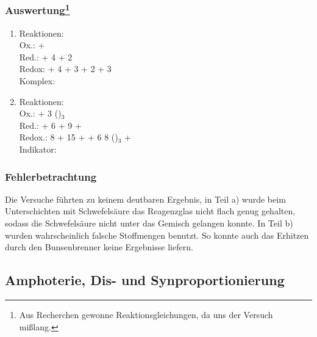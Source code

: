 \documentclass{scrartcl}
\begin{document}
\subsubsection[Auswertung]{Auswertung\footnote{Aus Recherchen gewonne Reaktionsgleichungen, da uns der Versuch mißlang.}}
\begin{enumerate}[label=\alph*)]
\item Reaktionen: \\
	Ox.:  \ch{<=>}  +  \\
	Red.:  + 4    + 2  \\
	Redox:  + 4  + 3  \ch{<=>}  + 2  + 3  \\
	Komplex: 
\item Reaktionen: \\
	Ox.:  + 3  \ch{<=>} ()$_3$  \\
       Red.:  + 6  +  9  +  \\
       Redox.: 8  + 15  +  + 6  \ch{<=>} 8 ()$_3$ +  \\
       Indikator: 
\end{enumerate}
\subsubsection{Fehlerbetrachtung}
Die Versuche führten zu keinem deutbaren Ergebnis, in Teil a) wurde beim Unterschichten mit Schwefelsäure das Reagenzglas nicht flach genug gehalten, sodass die Schwefelsäure nicht unter das Gemisch gelangen konnte. In Teil b) wurden wahrscheinlich falsche Stoffmengen benutzt. So konnte auch das Erhitzen durch den Bunsenbrenner keine Ergebnisse liefern. 
 \subsection{Amphoterie, Dis- und Synproportionierung}
\end{document}
